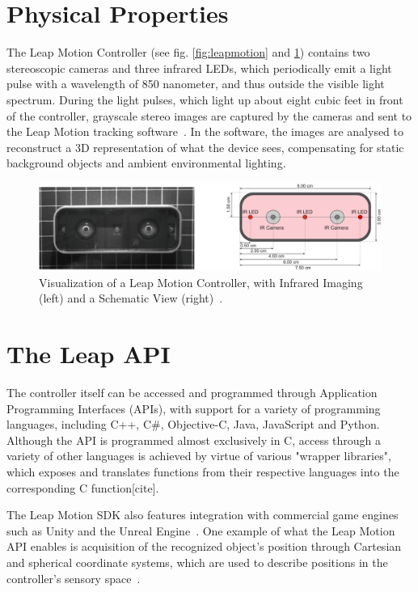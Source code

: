\documentclass[UKenglish]{ifimaster}
\begin{document}
\section{Physical Properties}
The Leap Motion Controller (see fig. \ref{fig:leapmotion} and \ref{fig:leapmotion2}) contains two stereoscopic cameras and three infrared LEDs, which periodically emit a light pulse with a wavelength of 850 nanometer, and thus outside the visible light spectrum. During the light pulses, which light up about eight cubic feet in front of the controller, grayscale stereo images are captured by the cameras and sent to the Leap Motion tracking software~\citep{LeapMotion2016}. In the software, the images are analysed to reconstruct a 3D representation of what the device sees, compensating for static background objects and ambient environmental lighting. 

\begin{figure}%
	\includegraphics[width=\linewidth]{pictures/LMC_measures.png}
	\caption{Visualization of a Leap Motion Controller, with Infrared Imaging (left) and a Schematic View (right)~\citep{Weichert2013}.}
	\label{fig:leapmotion2}
\end{figure} 

\section{The Leap API}
The controller itself can be accessed and programmed through Application Programming Interfaces (APIs), with support for a variety of programming languages, including C++, C\#, Objective-C, Java, JavaScript and Python. Although the API is programmed almost exclusively in C, access through a variety of other languages is achieved by virtue of various "wrapper libraries", which exposes and translates functions from their respective languages into the corresponding C function[cite].

The Leap Motion SDK also features integration with commercial game engines such as Unity and the Unreal Engine~\citep{Guna2014}. One example of what the Leap Motion API enables is acquisition of the recognized object's position through Cartesian and spherical coordinate systems, which are used to describe positions in the controller's sensory space~\citep{Guna2014}.  
\end{document}
